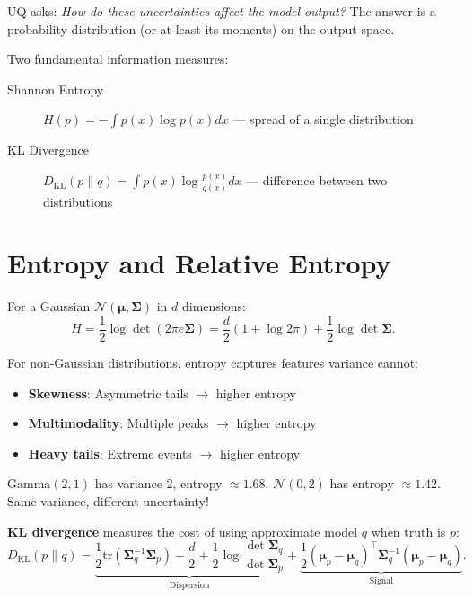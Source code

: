 UQ asks: \emph{How do these uncertainties affect the model output?} The answer is a probability distribution (or at least its moments) on the output space.

Two fundamental information measures:
\begin{description}
    \item[Shannon Entropy] $H(p) = -\int p(x) \log p(x) dx$ --- spread of a single distribution
    \item[KL Divergence] $D_{\mathrm{KL}}(p\|q) = \int p(x) \log \frac{p(x)}{q(x)} dx$ --- difference between two distributions
\end{description}

\section{Entropy and Relative Entropy}
\label{sec:uq:entropy}

For a Gaussian $\mathcal{N}(\bm{\mu}, \bm{\Sigma})$ in $d$ dimensions:
\[
H = \frac{1}{2} \log \det(2\pi e \bm{\Sigma}) = \frac{d}{2}(1 + \log 2\pi) + \frac{1}{2} \log \det \bm{\Sigma}.
\]

For non-Gaussian distributions, entropy captures features variance cannot:
\begin{itemize}
    \item \textbf{Skewness}: Asymmetric tails $\to$ higher entropy
    \item \textbf{Multimodality}: Multiple peaks $\to$ higher entropy
    \item \textbf{Heavy tails}: Extreme events $\to$ higher entropy
\end{itemize}

\begin{example}
$\mathrm{Gamma}(2, 1)$ has variance 2, entropy $\approx 1.68$. $\mathcal{N}(0, 2)$ has entropy $\approx 1.42$. Same variance, different uncertainty! \cite{chen2025uq}
\end{example}

\textbf{KL divergence} measures the cost of using approximate model $q$ when truth is $p$:
\[
D_{\mathrm{KL}}(p\|q) = \underbrace{\frac{1}{2} \mathrm{tr}(\bm{\Sigma}_q^{-1} \bm{\Sigma}_p) - \frac{d}{2} + \frac{1}{2} \log \frac{\det \bm{\Sigma}_q}{\det \bm{\Sigma}_p}}_{\text{Dispersion}} + \underbrace{\frac{1}{2} (\bm{\mu}_p - \bm{\mu}_q)^\top \bm{\Sigma}_q^{-1} (\bm{\mu}_p - \bm{\mu}_q)}_{\text{Signal}}.
\]

